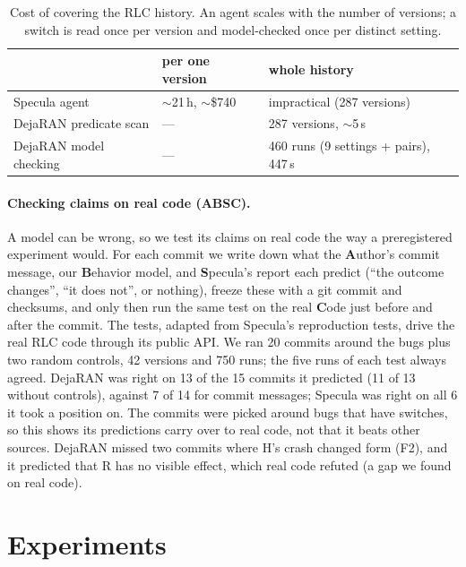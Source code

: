 \documentclass[sigconf,10pt]{acmart}
\newcommand{\sw}[1]{\textsf{\small #1}}
\begin{document}
\begin{table}[t]
\centering\small
\caption{Cost of covering the RLC history. An agent scales with the
number of versions; a switch is read once per version and model-checked
once per distinct setting.}
\label{tab:cost}
\footnotesize\setlength{\tabcolsep}{4pt}
\begin{tabular}{@{}lll@{}}
\toprule
 & per one version & whole history \\
\midrule
Specula agent~\cite{cheng2026specula} & $\sim$21\,h, $\sim$\$740 & impractical (287 versions) \\
DejaRAN predicate scan & --- & 287 versions, $\sim$5\,s \\
DejaRAN model checking & --- & 460 runs (9 settings + pairs), 447\,s \\
\bottomrule
\end{tabular}
\end{table}

\paragraph{Checking claims on real code (ABSC).}
A model can be wrong, so we test its claims on real code the way a
preregistered experiment would. For each commit we write down what the
\textbf{A}uthor's commit message, our \textbf{B}ehavior model, and
\textbf{S}pecula's report each predict (``the outcome changes'', ``it
does not'', or nothing), freeze these with a git commit and checksums,
and only then run the same test on the real \textbf{C}ode just before and
after the commit. The tests, adapted from Specula's reproduction tests,
drive the real RLC code through its public API. We ran 20 commits around
the bugs plus two random controls, 42 versions and 750 runs; the five
runs of each test always agreed. DejaRAN was right on 13 of the 15
commits it predicted (11 of 13 without controls), against 7 of 14 for
commit messages; Specula was right on all 6 it took a position on. The
commits were picked around bugs that have switches, so this shows its
predictions carry over to real code, not that it beats other sources.
DejaRAN missed two commits where \sw{H}'s crash changed form (F2), and it
predicted that \sw{R} has no visible effect, which real code refuted (a
gap we found on real code).

\section{Experiments}
\label{sec:findings}
\end{document}
